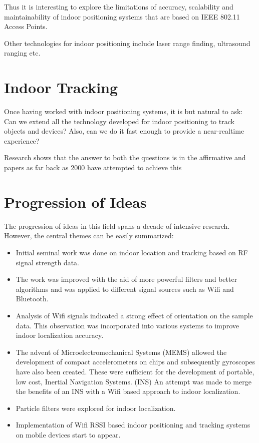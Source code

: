 Thus it is interesting to explore the limitations of accuracy, scalability and
maintainability of indoor positioning systems that are based on IEEE 802.11
Access Points.

Other technologies for indoor positioning include laser range finding, 
ultrasound ranging etc. 

\section{Indoor Tracking}

Once having worked with indoor positioning systems, it is but natural to ask:
Can we extend all the technology developed for indoor positioning to track 
objects and devices? Also, can we do it fast enough to provide a near-realtime
experience?

Research shows that the answer to both the questions is in the affirmative
and papers as far back as 2000 \cite{RADAR} have attempted to achieve this 

\section{Progression of Ideas}

The progression of ideas in this field spans a decade of intensive research. 
However, the central themes can be easily summarized:

\begin{itemize}
\item Initial seminal work was done on indoor location and tracking based on RF signal strength data.
\item The work was improved with the aid of more powerful filters and better algorithms and was applied to different signal sources such as Wifi and Bluetooth.
\item Analysis of Wifi signals indicated a strong effect of orientation on the sample data. This observation was incorporated into various systems to improve indoor localization accuracy.
\item The advent of Microelectromechanical Systems (MEMS) allowed the development of compact accelerometers on chips and subsequently gyroscopes have also been created. These were sufficient for the development of portable, low cost, Inertial Navigation Systems. (INS) An attempt was made to merge the benefits of an INS with a Wifi based approach to indoor localization. 
\item Particle filters were explored for indoor localization.
\item Implementation of Wifi RSSI based indoor positioning and tracking systems on mobile devices start to appear.
\end{itemize}

